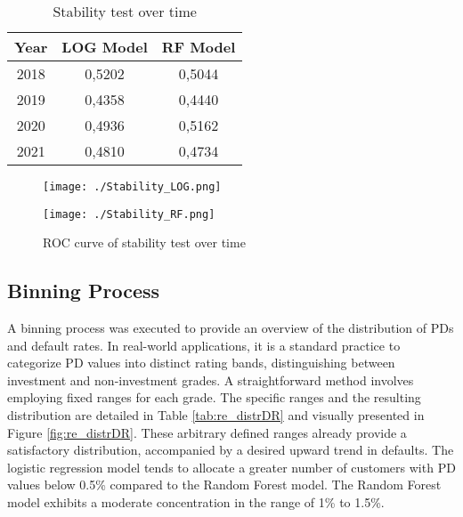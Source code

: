 \begin{table}[H]
\centering
\begin{tabular}{ccc}\toprule
\textbf{Year} & \textbf{LOG Model} & \textbf{RF Model} \\\midrule
2018          & 0,5202             & 0,5044            \\
2019          & 0,4358             & 0,4440            \\
2020          & 0,4936             & 0,5162            \\
2021          & 0,4810             & 0,4734        	\\\bottomrule   
\end{tabular}
\caption{Stability test over time}
\label{tab:re_stab}
\end{table}

\begin{figure}[H]
\begin{minipage}{.5\textwidth}
	\centering
	\texttt{[image: ./Stability\_LOG.png]}
\end{minipage}%
\begin{minipage}{.5\textwidth}
	\centering
	\texttt{[image: ./Stability\_RF.png]}
\end{minipage}
    \caption{ROC curve of stability test over time}
    \label{fig:re_rocstab}
\end{figure}

\subsection{Binning Process}
A binning process was executed to provide an overview of the distribution of PDs and default rates. In real-world applications, it is a standard practice to categorize PD values into distinct rating bands, distinguishing between investment and non-investment grades. A straightforward method involves employing fixed ranges for each grade. The specific ranges and the resulting distribution are detailed in Table \ref{tab:re_distrDR} and visually presented in Figure \ref{fig:re_distrDR}. These arbitrary defined ranges already provide a satisfactory distribution, accompanied by a desired upward trend in defaults. The logistic regression model tends to allocate a greater number of customers with PD values below 0.5\% compared to the Random Forest model. The Random Forest model exhibits a moderate concentration in the range of 1\% to 1.5\%.

